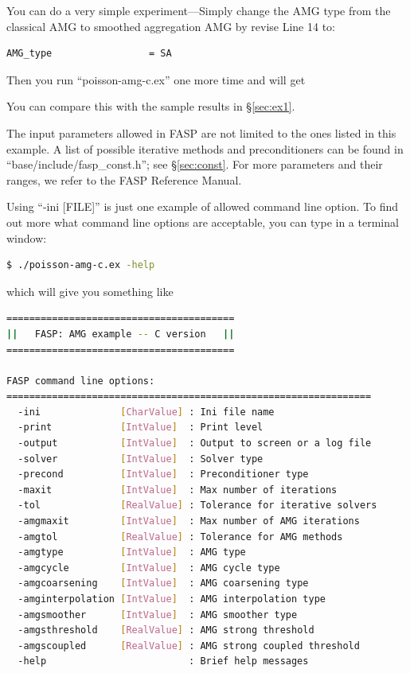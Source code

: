 \documentclass[11pt]{memoir}
\begin{document}
You can do a very simple experiment---Simply change the AMG type from the classical AMG to smoothed aggregation AMG by revise Line 14 to:
%
\begin{lstlisting}[numbers=none]
AMG_type                 = SA
\end{lstlisting}
%
Then you run ``poisson-amg-c.ex'' one more time and will get
%

%
You can compare this with the sample results in \S\ref{sec:ex1}.

\begin{snugshade}\noindent  
The input parameters allowed in FASP are not limited to the ones listed in this example. A list of possible iterative methods and preconditioners can be found in ``base/include/fasp\_const.h''; see \S\ref{sec:const}. For more parameters and their ranges, we refer to the FASP Reference Manual.
\end{snugshade}

Using ``-ini [FILE]'' is just one example of allowed command line option. To find out more what command line options are acceptable, you can type in a terminal window:
%
\begin{lstlisting}[numbers=none,language=sh]
$ ./poisson-amg-c.ex -help
\end{lstlisting}
%
which will give you something like
%
\begin{lstlisting}[numbers=none,language=sh]
========================================
||   FASP: AMG example -- C version   ||
========================================

FASP command line options:
================================================================
  -ini              [CharValue] : Ini file name
  -print            [IntValue]  : Print level
  -output           [IntValue]  : Output to screen or a log file
  -solver           [IntValue]  : Solver type
  -precond          [IntValue]  : Preconditioner type
  -maxit            [IntValue]  : Max number of iterations
  -tol              [RealValue] : Tolerance for iterative solvers
  -amgmaxit         [IntValue]  : Max number of AMG iterations
  -amgtol           [RealValue] : Tolerance for AMG methods
  -amgtype          [IntValue]  : AMG type
  -amgcycle         [IntValue]  : AMG cycle type
  -amgcoarsening    [IntValue]  : AMG coarsening type
  -amginterpolation [IntValue]  : AMG interpolation type
  -amgsmoother      [IntValue]  : AMG smoother type
  -amgsthreshold    [RealValue] : AMG strong threshold
  -amgscoupled      [RealValue] : AMG strong coupled threshold
  -help                         : Brief help messages
 \end{lstlisting}
%
\end{document}

